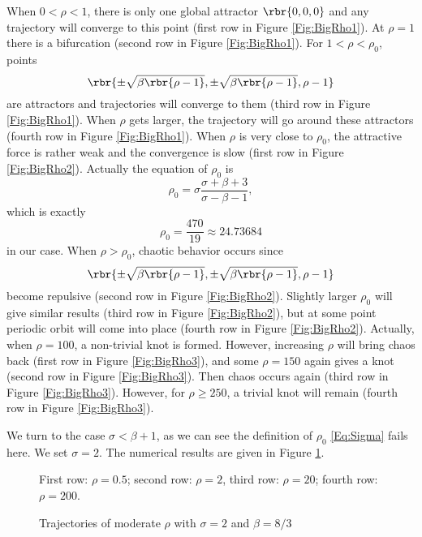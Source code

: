 \documentclass[english, nochinese]{pnote}
\begin{document}
When $ 0 < \rho < 1 $, there is only one global attractor $ \rbr{ 0, 0, 0 } $ and any trajectory will converge to this point (first row in Figure \ref{Fig:BigRho1}). At $ \rho = 1 $ there is a bifurcation (second row in Figure \ref{Fig:BigRho1}). For $ 1 < \rho < \rho_0 $, points
\begin{equation}
\rbr{ \pm \sqrt{ \beta \rbr{ \rho - 1 } }, \pm \sqrt{ \beta \rbr{ \rho - 1 } }, \rho - 1 }
\end{equation}
are attractors and trajectories will converge to them (third row in Figure \ref{Fig:BigRho1}). When $\rho$ gets larger, the trajectory will go around these attractors (fourth row in Figure \ref{Fig:BigRho1}). When $\rho$ is very close to $\rho_0$, the attractive force is rather weak and the convergence is slow (first row in Figure \ref{Fig:BigRho2}). Actually the equation of $\rho_0$ is
\begin{equation} \label{Eq:Sigma}
\rho_0 = \sigma \frac{ \sigma + \beta + 3 }{ \sigma - \beta - 1 },
\end{equation}
which is exactly
\begin{equation}
\rho_0 = \frac{470}{19} \approx 24.73684
\end{equation}
in our case. When $ \rho > \rho_0 $, chaotic behavior occurs since
\begin{equation}
\rbr{ \pm \sqrt{ \beta \rbr{ \rho - 1 } }, \pm \sqrt{ \beta \rbr{ \rho - 1 } }, \rho - 1 }
\end{equation}
become repulsive (second row in Figure \ref{Fig:BigRho2}). Slightly larger $\rho_0$ will give similar results (third row in Figure \ref{Fig:BigRho2}), but at some point periodic orbit will come into place (fourth row in Figure \ref{Fig:BigRho2}). Actually, when $ \rho = 100 $, a non-trivial knot is formed. However, increasing $\rho$ will bring chaos back (first row in Figure \ref{Fig:BigRho3}), and some $ \rho = 150 $ again gives a knot (second row in Figure \ref{Fig:BigRho3}). Then chaos occurs again (third row in Figure \ref{Fig:BigRho3}). However, for $ \rho \ge 250 $, a trivial knot will remain (fourth row in Figure \ref{Fig:BigRho3}).

We turn to the case $ \sigma < \beta + 1 $, as we can see the definition of $\rho_0$ \eqref{Eq:Sigma} fails here. We set $ \sigma = 2 $. The numerical results are given in Figure \ref{Fig:SmallRho}.

\begin{figure}[htbp]
{
\centering
\scalebox{0.5}{}
\scalebox{0.5}{}
\scalebox{0.5}{}
\scalebox{0.5}{}
\caption{Trajectories of moderate $\rho$ with $ \sigma = 2 $ and $ \beta = 8 / 3 $}
\label{Fig:SmallRho}
}
{
\footnotesize First row: $ \rho = 0.5 $; second row: $ \rho = 2 $, third row: $ \rho = 20 $; fourth row: $ \rho = 200 $.
}
\end{figure}
\end{document}
